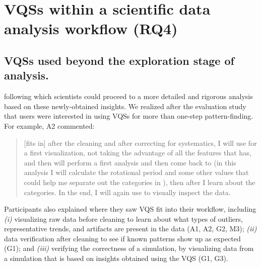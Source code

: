 \section{VQSs within a scientific data analysis workflow (RQ4)}
\subsection{VQSs used beyond the exploration stage of analysis.} 
\par {}  following which scientists could proceed to a more detailed and rigorous analysis based on these newly-obtained insights. We realized after the evaluation study that users were interested in using VQSs for more than one-step pattern-finding. For example, A2 commented:
\begin{quote}
[\zv fits in] after the cleaning and after correcting for systematics, I will use \zv for a first visualization, not taking the advantage of all the features that \zv has, and then will perform a first analysis and then come back to \zv (in this analysis I will calculate the rotational period and some other values that could help me separate out the categories in \zv), then after I learn about the categories. In the end, I will again use \zv to visually inspect the data. %
\end{quote}
Participants also explained where they saw VQS fit into their workflow, including {\em (i)}
visualizing raw data before cleaning to learn about what types of outliers, representative trends, and artifacts are present in the data (A1, A2, G2, M3); {\em (ii)}
 data verification after cleaning to see if known patterns show up as expected (G1);
 and {\em (iii)}
verifying the correctness of a simulation, by visualizing data from a simulation that is based on insights obtained using the VQS (G1, G3).
